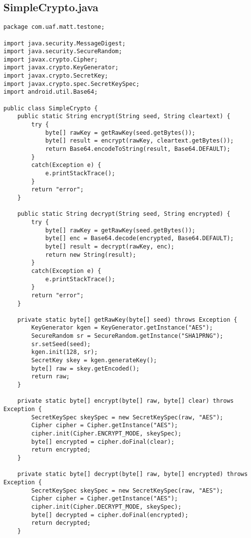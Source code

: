 \subsection{SimpleCrypto.java}
\label{app:casimplecrypto}
\begin{lstlisting}
package com.uaf.matt.testone;

import java.security.MessageDigest;
import java.security.SecureRandom;
import javax.crypto.Cipher;
import javax.crypto.KeyGenerator;
import javax.crypto.SecretKey;
import javax.crypto.spec.SecretKeySpec;
import android.util.Base64;

public class SimpleCrypto {
    public static String encrypt(String seed, String cleartext) {
        try {
            byte[] rawKey = getRawKey(seed.getBytes());
            byte[] result = encrypt(rawKey, cleartext.getBytes());
            return Base64.encodeToString(result, Base64.DEFAULT);
        }
        catch(Exception e) {
            e.printStackTrace();
        }
        return "error";
    }

    public static String decrypt(String seed, String encrypted) {
        try {
            byte[] rawKey = getRawKey(seed.getBytes());
            byte[] enc = Base64.decode(encrypted, Base64.DEFAULT);
            byte[] result = decrypt(rawKey, enc);
            return new String(result);
        }
        catch(Exception e) {
            e.printStackTrace();
        }
        return "error";
    }

    private static byte[] getRawKey(byte[] seed) throws Exception {
        KeyGenerator kgen = KeyGenerator.getInstance("AES");
        SecureRandom sr = SecureRandom.getInstance("SHA1PRNG");
        sr.setSeed(seed);
        kgen.init(128, sr);
        SecretKey skey = kgen.generateKey();
        byte[] raw = skey.getEncoded();
        return raw;
    }

    private static byte[] encrypt(byte[] raw, byte[] clear) throws Exception {
        SecretKeySpec skeySpec = new SecretKeySpec(raw, "AES");
        Cipher cipher = Cipher.getInstance("AES");
        cipher.init(Cipher.ENCRYPT_MODE, skeySpec);
        byte[] encrypted = cipher.doFinal(clear);
        return encrypted;
    }

    private static byte[] decrypt(byte[] raw, byte[] encrypted) throws Exception {
        SecretKeySpec skeySpec = new SecretKeySpec(raw, "AES");
        Cipher cipher = Cipher.getInstance("AES");
        cipher.init(Cipher.DECRYPT_MODE, skeySpec);
        byte[] decrypted = cipher.doFinal(encrypted);
        return decrypted;
    }


\end{lstlisting}
